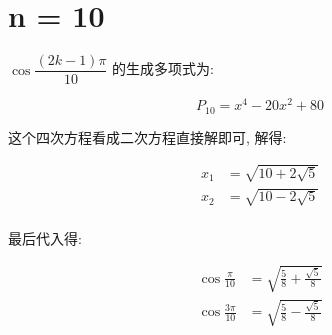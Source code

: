 \chapter{n = 10}\label{ch:cos10}

$\cos\dfrac{(2k-1)π}{10}$ 的生成多项式为:

$$
P_{10} = x^4 - 20x^2 + 80
$$

这个四次方程看成二次方程直接解即可, 解得:

$$
\begin{aligned}
x_1&=\sqrt{10 + 2\sqrt{5}}\\
x_2&=\sqrt{10 - 2\sqrt{5}}\\
\end{aligned}
$$

最后代入得:

$$
\begin{aligned}
\cos\frac{ π}{10}&=\sqrt{\frac{5}{8}+\frac{\sqrt{5}}{8}}\\
\cos\frac{3π}{10}&=\sqrt{\frac{5}{8}-\frac{\sqrt{5}}{8}}\\
\end{aligned}
$$